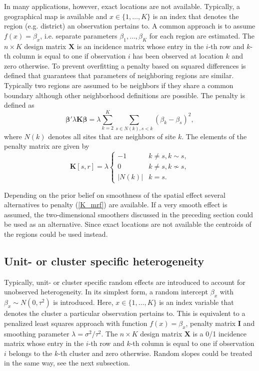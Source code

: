 \documentclass[11pt,a4paper,twoside]{bayesxarticle}
\def \Kvec {\vec{K}}
\def \betavec {\boldsymbol{\beta}}
\def \Kvec {\mathbf{K}}
\def \Ivec {\mathbf{I}}
\def \Xvec {\mathbf{X}}
\begin{document}
In many applications, however, exact locations are not available. Typically, a geographical map is available and $x \in \{1,\dots,K\}$ is an
index that denotes the region (e.g. district) an observation pertains to. A common approach is to assume $f(x) = \beta_x$,
i.e. separate parameters $\beta_1,\ldots,\beta_K$  for each region are estimated.
The $n \times K$ design matrix $\Xvec$ is an incidence matrix whose entry in
the $i$-th row and $k$-th column is equal to one if observation $i$ has been observed at
location $k$ and zero otherwise. To prevent overfitting a penalty based on squared differences is defined that
guarantees that parameters of neighboring regions are similar. Typically two regions are assumed to be neighbors if they share a common
boundary although other neighborhood definitions are possible. The penalty is defined as
$$
\betavec' \lambda \Kvec \betavec = \lambda\sum_{k=2}^{K}\sum_{s \in N(k), s < k}(\beta_k-\beta_s)^2,
$$
where $N(k)$ denotes all sites that are neighbors of site $k$.
The elements of the penalty matrix are given by
\begin{equation}
\label{K_mrf}
 \Kvec[s,r] = \lambda \left\{
 \begin{array}{ll}
-1 & k\neq s, k\sim s,\\
 0 & k\neq s, k \nsim s,\\
 |N(k)| & k=s.
\end{array}
\right.
\end{equation}

Depending on the prior belief on smoothness of the spatial effect
several alternatives to penalty (\ref{K_mrf}) are available. If a
very smooth effect is assumed, the two-dimensional smoothers
discussed in the preceding section could be used as an alternative.
Since exact locations are not available the centroids of the regions
could be used instead.

\subsection{Unit- or cluster specific heterogeneity}
Typically, unit- or cluster specific random effects are introduced
to account for unobserved heterogeneity. In its simplest form, a
random intercept $\beta_x$ with $\beta_x \sim N(0,\tau^2)$ is
introduced. Here, $x \in \{1,\dots,K\}$ is an index variable that
denotes the cluster a particular observation pertains to. This is
equivalent to a penalized least squares approach with function $f(x)
= \beta_x$, penalty matrix $\Ivec$ and smoothing parameter $\lambda
= \sigma^2/\tau^2$. The $n \times K$ design matrix $\Xvec$ is a 0/1
incidence matrix whose entry in the $i$-th row and $k$-th column is
equal to one if observation $i$ belongs to the $k$-th cluster and
zero otherwise. Random slopes could be treated in the same way, see
the next subsection.
\end{document}
